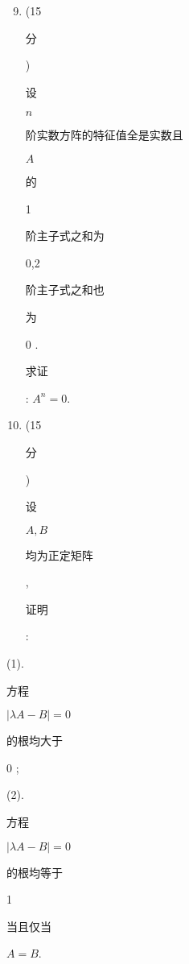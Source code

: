 \documentclass[10pt]{article}
\begin{document}
\begin{enumerate}
  \setcounter{enumi}{8}
  \item (15 \begin{CJK}{UTF8}{mj}分\end{CJK}) \begin{CJK}{UTF8}{mj}设\end{CJK} $n$ \begin{CJK}{UTF8}{mj}阶实数方阵的特征值全是实数且\end{CJK} $A$ \begin{CJK}{UTF8}{mj}的\end{CJK} 1 \begin{CJK}{UTF8}{mj}阶主子式之和为\end{CJK} 0,2 \begin{CJK}{UTF8}{mj}阶主子式之和也\end{CJK} \begin{CJK}{UTF8}{mj}为\end{CJK} 0 . \begin{CJK}{UTF8}{mj}求证\end{CJK}: $A^{n}=0$.

  \item (15 \begin{CJK}{UTF8}{mj}分\end{CJK}) \begin{CJK}{UTF8}{mj}设\end{CJK} $A, B$ \begin{CJK}{UTF8}{mj}均为正定矩阵\end{CJK}, \begin{CJK}{UTF8}{mj}证明\end{CJK}:

\end{enumerate}
(1). \begin{CJK}{UTF8}{mj}方程\end{CJK} $|\lambda A-B|=0$ \begin{CJK}{UTF8}{mj}的根均大于\end{CJK} 0 ;

(2). \begin{CJK}{UTF8}{mj}方程\end{CJK} $|\lambda A-B|=0$ \begin{CJK}{UTF8}{mj}的根均等于\end{CJK} 1 \begin{CJK}{UTF8}{mj}当且仅当\end{CJK} $A=B$.
\end{document}
